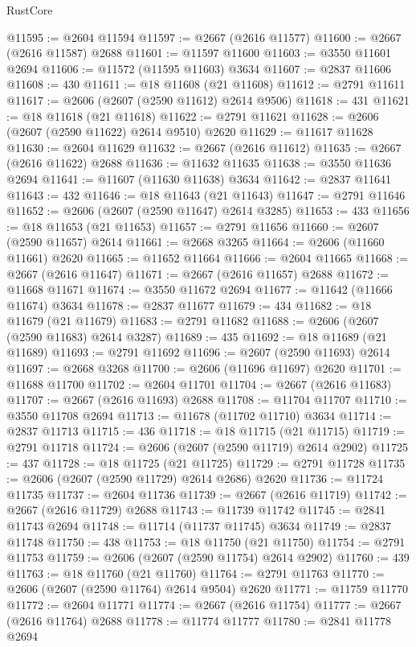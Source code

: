 \begin{lexlean}{RustCore}
\begin{coremodule}
@11595 := @2604 @11594
@11597 := @2667 (@2616 @11577)
@11600 := @2667 (@2616 @11587) @2688
@11601 := @11597 @11600
@11603 := @3550 @11601 @2694
@11606 := @11572 (@11595 @11603) @3634
@11607 := @2837 @11606
@11608 := 430
@11611 := @18 @11608 (@21 @11608)
@11612 := @2791 @11611
@11617 := @2606 (@2607 (@2590 @11612) @2614 @9506)
@11618 := 431
@11621 := @18 @11618 (@21 @11618)
@11622 := @2791 @11621
@11628 := @2606 (@2607 (@2590 @11622) @2614 @9510) @2620
@11629 := @11617 @11628
@11630 := @2604 @11629
@11632 := @2667 (@2616 @11612)
@11635 := @2667 (@2616 @11622) @2688
@11636 := @11632 @11635
@11638 := @3550 @11636 @2694
@11641 := @11607 (@11630 @11638) @3634
@11642 := @2837 @11641
@11643 := 432
@11646 := @18 @11643 (@21 @11643)
@11647 := @2791 @11646
@11652 := @2606 (@2607 (@2590 @11647) @2614 @3285)
@11653 := 433
@11656 := @18 @11653 (@21 @11653)
@11657 := @2791 @11656
@11660 := @2607 (@2590 @11657) @2614
@11661 := @2668 @3265
@11664 := @2606 (@11660 @11661) @2620
@11665 := @11652 @11664
@11666 := @2604 @11665
@11668 := @2667 (@2616 @11647)
@11671 := @2667 (@2616 @11657) @2688
@11672 := @11668 @11671
@11674 := @3550 @11672 @2694
@11677 := @11642 (@11666 @11674) @3634
@11678 := @2837 @11677
@11679 := 434
@11682 := @18 @11679 (@21 @11679)
@11683 := @2791 @11682
@11688 := @2606 (@2607 (@2590 @11683) @2614 @3287)
@11689 := 435
@11692 := @18 @11689 (@21 @11689)
@11693 := @2791 @11692
@11696 := @2607 (@2590 @11693) @2614
@11697 := @2668 @3268
@11700 := @2606 (@11696 @11697) @2620
@11701 := @11688 @11700
@11702 := @2604 @11701
@11704 := @2667 (@2616 @11683)
@11707 := @2667 (@2616 @11693) @2688
@11708 := @11704 @11707
@11710 := @3550 @11708 @2694
@11713 := @11678 (@11702 @11710) @3634
@11714 := @2837 @11713
@11715 := 436
@11718 := @18 @11715 (@21 @11715)
@11719 := @2791 @11718
@11724 := @2606 (@2607 (@2590 @11719) @2614 @2902)
@11725 := 437
@11728 := @18 @11725 (@21 @11725)
@11729 := @2791 @11728
@11735 := @2606 (@2607 (@2590 @11729) @2614 @2686) @2620
@11736 := @11724 @11735
@11737 := @2604 @11736
@11739 := @2667 (@2616 @11719)
@11742 := @2667 (@2616 @11729) @2688
@11743 := @11739 @11742
@11745 := @2841 @11743 @2694
@11748 := @11714 (@11737 @11745) @3634
@11749 := @2837 @11748
@11750 := 438
@11753 := @18 @11750 (@21 @11750)
@11754 := @2791 @11753
@11759 := @2606 (@2607 (@2590 @11754) @2614 @2902)
@11760 := 439
@11763 := @18 @11760 (@21 @11760)
@11764 := @2791 @11763
@11770 := @2606 (@2607 (@2590 @11764) @2614 @9504) @2620
@11771 := @11759 @11770
@11772 := @2604 @11771
@11774 := @2667 (@2616 @11754)
@11777 := @2667 (@2616 @11764) @2688
@11778 := @11774 @11777
@11780 := @2841 @11778 @2694

\end{coremodule}
\end{lexlean}
